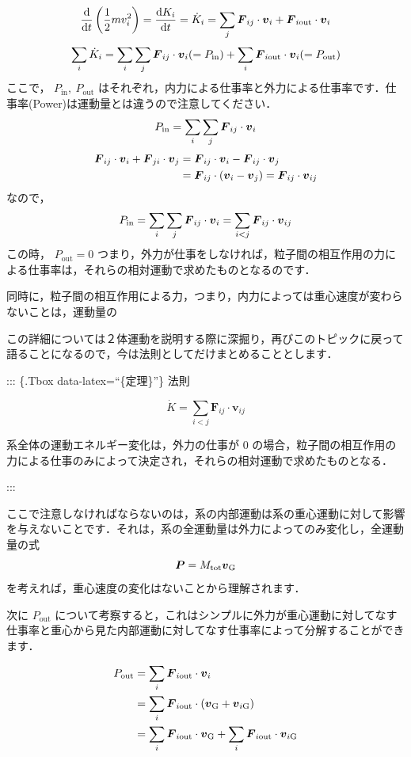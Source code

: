 \documentclass[
  b4paperpaper,
  xelatex,ja=standard]{bxjsbook}
\begin{document}
\[\dv{t}\left(\frac{1}{2}mv_i^2\right)=\dv{K_i}{t}=\dot{K}_i=\sum_j \boldsymbol{F}_{ij}\cdot\vb*{v}_i+\boldsymbol{F}_{i\text{out}}\cdot\vb*{v}_i\]
\[\sum_i \dot{K}_i=\sum_i\sum_j \boldsymbol{F}_{ij}\cdot\vb*{v}_i(=P_{\text{in}})+\sum_i\boldsymbol{F}_{i\text{out}}\cdot\vb*{v}_i(=P_{\text{out}})\]
ここで， \(P_{\text{in}},\:P_{\text{out}}\)
はそれぞれ，内力による仕事率と外力による仕事率です．仕事率(Power)は運動量とは違うので注意してください．
\begin{align*}
P_{\text{in}}=\sum_i\sum_j \boldsymbol{F}_{ij}\cdot\vb*{v}_i
\end{align*} \begin{align*}
\boldsymbol{F}_{ij}\cdot\vb*{v}_i+\boldsymbol{F}_{ji}\cdot\vb*{v}_j&=\boldsymbol{F}_{ij}\cdot\vb*{v}_i-\boldsymbol{F}_{ij}\cdot\vb*{v}_j\\
&=\boldsymbol{F}_{ij}\cdot(\boldsymbol{v}_{i}-\boldsymbol{v}_{j})=\boldsymbol{F}_{ij}\cdot\boldsymbol{v}_{ij}
\end{align*} なので， \[
P_{\text{in}}=\sum_i\sum_j \boldsymbol{F}_{ij}\cdot\vb*{v}_i=\sum_{i<j}\boldsymbol{F}_{ij}\cdot\boldsymbol{v}_{ij}
\] この時， \(P_{\text{out}}=0\)
つまり，外力が仕事をしなければ，粒子間の相互作用の力による仕事率は，それらの相対運動で求めたものとなるのです．

同時に，粒子間の相互作用による力，つまり，内力によっては重心速度が変わらないことは，運動量の

この詳細については２体運動を説明する際に深掘り，再びこのトピックに戻って語ることになるので，今は法則としてだけまとめることとします．

::: \{.Tbox data-latex=``\{定理\}''\} 法則

\[\dot{K}=\sum_{i<j}\boldsymbol{F}_{ij}\cdot\boldsymbol{v}_{ij}\]

系全体の運動エネルギー変化は，外力の仕事が \(0\)
の場合，粒子間の相互作用の力による仕事のみによって決定され，それらの相対運動で求めたものとなる．

:::

ここで注意しなければならないのは，系の内部運動は系の重心運動に対して影響を与えないことです．それは，系の全運動量は外力によってのみ変化し，全運動量の式
\[\vb*{P}=M_{\text{tot}}\boldsymbol{v}_{\text{G}} \]
を考えれば，重心速度の変化はないことから理解されます．

次に \(P_{\text{out}}\)
について考察すると，これはシンプルに外力が重心運動に対してなす仕事率と重心から見た内部運動に対してなす仕事率によって分解することができます．

\begin{align*}
P_{\text{out}} &= \sum_i\boldsymbol{F}_{i\text{out}}\cdot\vb*{v}_i\\
&= \sum_i\boldsymbol{F}_{i\text{out}}\cdot(\vb*{v}_{\text{G}}+\vb*{v}_{i\text{G}})\\
&=\sum_i\boldsymbol{F}_{i\text{out}}\cdot\vb*{v}_{\text{G}}+\sum_i\boldsymbol{F}_{i\text{out}}\cdot\vb*{v}_{i\text{G}}
\end{align*}
\end{document}
